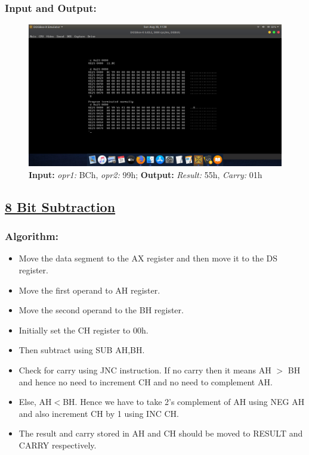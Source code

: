 \documentclass[12pt,a4paper]{article}
\begin{document}
\begin{flushleft}
\subsubsection*{\textbf{Input and Output:}}
\begin{figure}[h]
    \centering
    \includegraphics[trim = 100mm 70mm 100mm 80mm, clip, width = \textwidth]{Addition.png}
    \caption{ \textbf{Input:} \emph{opr1:} BCh, \emph{opr2:} 99h; 
              \textbf{Output:} \emph{Result:} 55h, \emph{Carry:} 01h}
\end{figure}
\newpage
\subsection*{\textbf{\underline{8 Bit Subtraction}}}

\subsubsection*{\textbf{Algorithm:}}
\begin{itemize}
    \item Move the data segment to the AX register and then move it to the DS register.
    \item Move the first operand to AH register.
    \item Move the second operand to the BH register.
    \item Initially set the CH register to 00h.
\item Then subtract using SUB AH,BH.
\item Check for carry using JNC instruction. If no carry then it means AH $>$ BH and hence no need to increment CH and no need to complement AH.
\item Else, AH$<$BH. Hence we have to take 2’s complement of AH using NEG AH and also increment CH by 1 using INC CH.
\item The result and carry stored in AH and CH should be moved to RESULT and CARRY respectively.
\end{itemize}


\end{flushleft}
\end{document}
